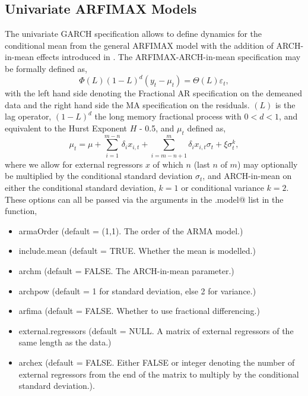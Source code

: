 \subsection{Univariate ARFIMAX Models}\label{section:umean}
The univariate GARCH specification allows to define dynamics for the conditional
mean from the general ARFIMAX model with the addition of ARCH-in-mean effects
introduced in \cite{Engle1987}.
The ARFIMAX-ARCH-in-mean specification may be formally defined as,
\begin{equation}\label{arfimax1}
\Phi(L){(1 - L)^d}({y_t} - {\mu _t}) = \Theta (L){\varepsilon _t},
\end{equation}
with the left hand side denoting the Fractional AR specification on the demeaned
data and the right hand side the MA specification on the residuals. $(L)$ is the
lag operator, $(1 - L)^d$ the long memory fractional process with $0 < d < 1$,
and equivalent to the Hurst Exponent $H$ - 0.5, and $\mu_t$ defined as,
\begin{equation}\label{arfimax2}
{\mu _t} = \mu  + \sum\limits_{i = 1}^{m - n} {{\delta _i}} {x_{i,t}} + \sum\limits_{i = m - n + 1}^m {\delta _i}{x_{i,t}}{\sigma _t} + \xi \sigma _t^k,
\end{equation}
where we allow for \verb@m@ external regressors $x$ of which $n$ (last $n$ of $m$)
may optionally be multiplied by the conditional standard deviation $\sigma_t$,
and ARCH-in-mean on either the conditional standard deviation, $k=1$ or conditional
variance $k=2$. These options can all be passed via the arguments in the \verb@mean.model@
list in the \verb@ugarchspec@ function,
\begin{itemize}
\item armaOrder 	   (default = (1,1). The order of the ARMA model.)
\item include.mean 	   (default = TRUE.  Whether the mean is modelled.)
\item archm			   (default = FALSE. The ARCH-in-mean parameter.)
\item archpow   	   (default = 1 for standard deviation, else 2 for variance.)
\item arfima	   	   (default = FALSE. Whether to use fractional differencing.)
\item external.regressors (default = NULL. A matrix of external regressors of
the same length as the data.)
\item archex           (default = FALSE. Either FALSE or integer denoting the number of external
regressors from the end of the matrix to multiply by the conditional standard deviation.).
\end{itemize}
